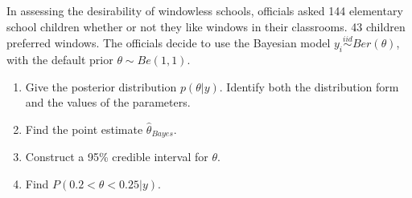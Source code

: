   \item 
    In assessing the desirability of windowless schools, officials asked 144
    elementary school children whether or not they like windows in their
    classrooms. 43 children preferred windows. The officials decide to use the Bayesian model $y_i\stackrel{iid}{\sim}Ber(\theta)$, with the default prior $\theta \sim Be(1,1)$.
    \begin{enumerate}
      \item Give the posterior distribution $ p(\theta | y)$. Identify both the distribution form and the values of the parameters. 
      \item Find the point estimate $\hat{\theta}_{Bayes}$. 
      \item Construct a 95\% credible interval for $\theta$. 
      \item Find $P(0.2<\theta <0.25| y)$.
\end{enumerate}

